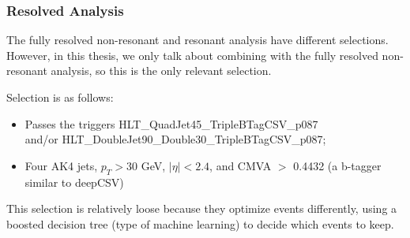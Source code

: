 \subsubsection{Resolved Analysis\label{sss:resolve}}
The fully resolved non-resonant and resonant analysis have different selections. However, in this thesis, we only talk about combining with the fully resolved non-resonant analysis, so this is the only relevant selection.

Selection is as follows:
\begin{itemize}
\item Passes the triggers HLT\_QuadJet45\_TripleBTagCSV\_p087 \\and/or HLT\_DoubleJet90\_Double30\_TripleBTagCSV\_p087;
\item Four AK4 jets, $p_{T} > 30$ GeV, $|\eta| < 2.4$, and CMVA $>$ 0.4432 (a b-tagger similar to deepCSV)
\end{itemize}

This selection is relatively loose because they optimize events differently, using a boosted decision tree (type of machine learning) to decide which events to keep.

